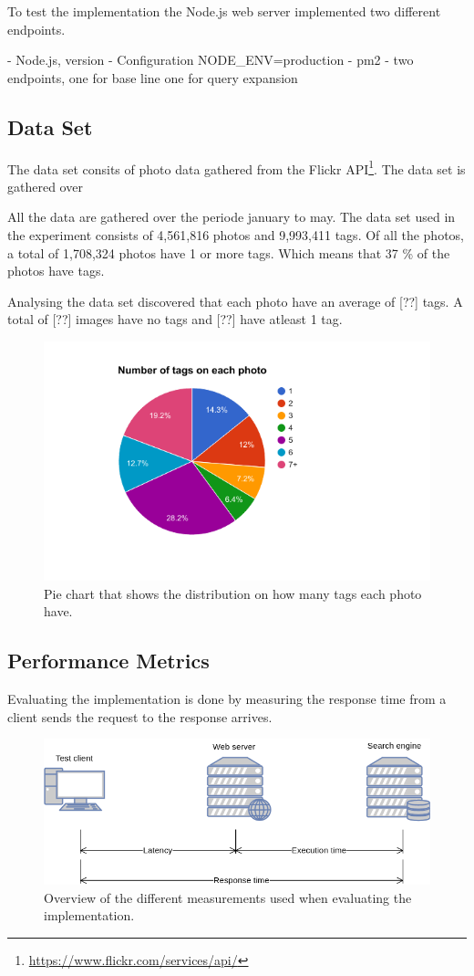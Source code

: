 To test the implementation the Node.js web server implemented two different endpoints.

- Node.js, version
- Configuration NODE\_ENV=production
- pm2
- two endpoints, one for base line one for query expansion

\subsection{Data Set}
\label{sec:dataset}
The data set consits of photo data gathered from the Flickr API\footnote{\url{https://www.flickr.com/services/api/}}.
The data set is gathered over

All the data are gathered over the periode january to may.
The data set used in the experiment consists of 4,561,816 photos and 9,993,411 tags.
Of all the photos, a total of 1,708,324 photos have 1 or more tags.
Which means that 37 \% of the photos have tags.

Analysing the data set discovered that each photo have an average of [??] tags.
A total of [??] images have no tags and [??] have atleast 1 tag.

\begin{figure}[h!]
  \centering \includegraphics[width=1\linewidth]{img/number-of-tags-distribution.png}
  \caption{Pie chart that shows the distribution on how many tags each photo have.}
  \label{fig:result-vary-result-size}
\end{figure}

\subsection{Performance Metrics}
Evaluating the implementation is done by measuring the response time from a client sends the request to the response arrives.


\begin{figure}[h!]
  \centering \includegraphics[width=0.9\linewidth]{img/latency-measurements.png}
  \caption{Overview of the different measurements used when evaluating the implementation.}
  \label{fig:latency-measurements}
\end{figure}
